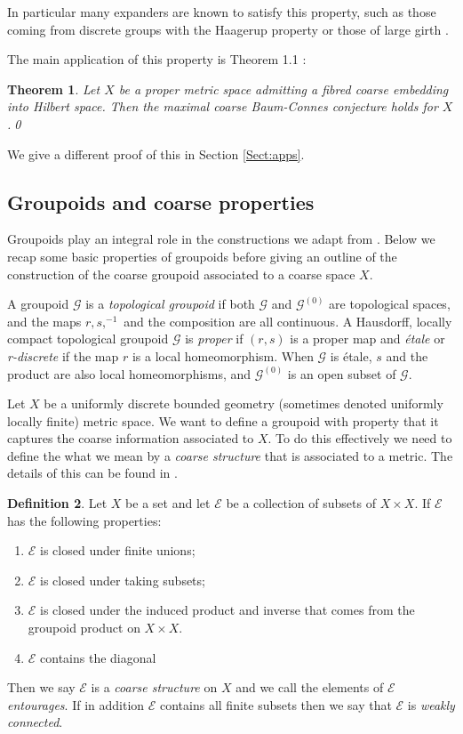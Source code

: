 \documentclass[preprint]{elsarticle}
\theoremstyle{plain}
\newtheorem{theorem}{Theorem}%
\theoremstyle{definition}%
\newtheorem{definition}[theorem]{Definition}%
\theoremstyle{remark}%
\newcommand{\G}{\mathcal{G}}
\begin{document}
In particular many expanders are known to satisfy this property, such as those coming from discrete groups with the Haagerup property  or those of large girth \cite{FCEpaper,MR2568691}.

The main application of this property is Theorem 1.1 \cite{FCEpaper}:

\begin{theorem}\label{Thm:FCEMR}
Let $X$ be a proper metric space admitting a fibred coarse embedding into Hilbert space. Then the maximal coarse Baum-Connes conjecture holds for $X$.\qed
\end{theorem}

We give a different proof of this in Section \ref{Sect:apps}.

\subsection{Groupoids and coarse properties}\label{sect:coarsegroupoids}
Groupoids play an integral role in the constructions we adapt from \cite{MR1905840}. Below we recap some basic properties of groupoids before giving an outline of the construction of the coarse groupoid associated to a coarse space $X$.

A groupoid $\G$ is a \textit{topological groupoid} if both $\G$ and $\G^{(0)}$ are topological spaces, and the maps $r,s, ^{-1}$ and the composition are all continuous. A Hausdorff, locally compact topological groupoid $\G$ is \textit{proper} if $(r,s)$ is a proper map and \textit{\'etale} or \textit{r-discrete} if the map $r$ is a local homeomorphism. When $\G$ is \'etale, $s$ and the product are also local homeomorphisms, and $\G^{(0)}$ is an open subset of $\G$.

Let $X$ be a uniformly discrete bounded geometry (sometimes denoted uniformly locally finite) metric space. We want to define a groupoid with property that it captures the coarse information associated to $X$. To do this effectively we need to define the what we mean by a \textit{coarse structure} that is associated to a metric. The details of this can be found in \cite{MR2007488}.

\begin{definition}
Let $X$ be a set and let $\mathcal{E}$ be a collection of subsets of $X \times X$. If $\mathcal{E}$ has the following properties:
\begin{enumerate}
\item $\mathcal{E}$ is closed under finite unions;
\item $\mathcal{E}$ is closed under taking subsets;
\item $\mathcal{E}$ is closed under the induced product and inverse that comes from the groupoid product on $X \times X$.
\item $\mathcal{E}$ contains the diagonal
\end{enumerate}
Then we say $\mathcal{E}$ is a \textit{coarse structure} on $X$ and we call the elements of $\mathcal{E}$ \textit{entourages}. If in addition $\mathcal{E}$ contains all finite subsets then we say that $\mathcal{E}$ is \textit{weakly connected}.
\end{definition}
\end{document}
